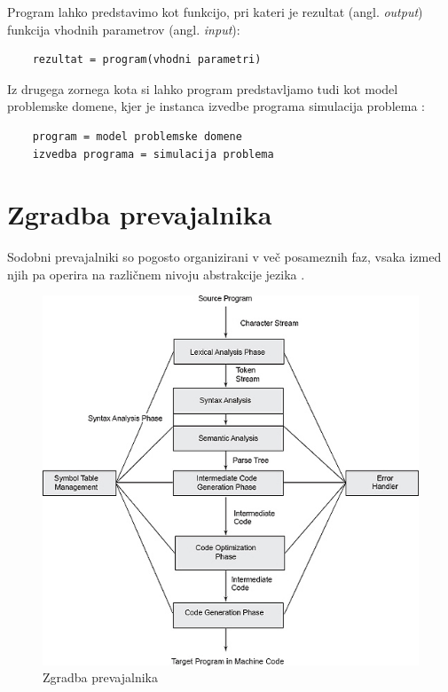 \documentclass[a4paper, 12p]{book}
\begin{document}
Program lahko predstavimo kot funkcijo, pri kateri je rezultat (angl. \textit{output}) funkcija vhodnih parametrov (angl. \textit{input}):
\begin{lstlisting}
	rezultat = program(vhodni parametri)
\end{lstlisting}

Iz drugega zornega kota si lahko program predstavljamo tudi kot model problemske domene, kjer je instanca izvedbe programa simulacija problema \cite{computationalModel}:
\begin{lstlisting}
	program = model problemske domene
	izvedba programa = simulacija problema
\end{lstlisting}

\section{Zgradba prevajalnika}

Sodobni prevajalniki so pogosto organizirani v več posameznih faz, vsaka izmed njih pa operira na različnem nivoju abstrakcije jezika \cite{modernCompiler}.

\begin{figure}[h]
	\begin{center}
		\includegraphics[width=1\textwidth]{resources/compilerStructure.jpg}
	\end{center}
	\caption{Zgradba prevajalnika \cite{compilerStructure}}
	\label{pic1}
\end{figure}
\end{document}
